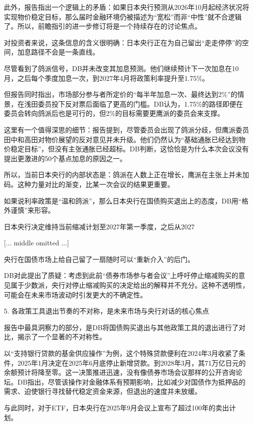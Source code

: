 \documentclass[11pt]{ctexart}
\begin{document}
此外，报告指出一个逻辑上的矛盾：如果日本央行预测从2026年10月起经济状况将实现物价稳定目标，那么届时金融环境仍被描述为“宽松”而非“中性”就不合逻辑了。所以，前瞻指引的进一步修订将是一个持续存在的讨论焦点。

对投资者来说，这条信息的含义很明确：日本央行正在为自己留出“走走停停”的空间，加息路径不会是一条直线。

尽管看到了鸽派信号，DB并未改变其加息预测。他们继续预计下一次加息在10月，之后每个季度加息一次，到2027年4月将政策利率提升至1.75\%。

但报告同时指出，市场部分参与者所定价的“每半年加息一次、最终达到2\%”的情景，在浅田委员投下反对票后面临了更高的门槛。DB认为，1.75\%的路径即便在委员会转向鸽派后也是可行的，但2\%的目标需要更鹰派的委员会来支撑。

这里有一个值得深思的细节：报告提到，尽管委员会出现了鸽派分歧，但鹰派委员田中和高田对物价展望的反对意见并未升级。他们仍然认为“基础通胀已经达到物价稳定目标”，但没有主张通胀已经超标。DB判断，这恰恰是为什么本次会议没有提出更激进的50个基点加息的原因之一。

所以，当前日本央行的内部状态是：鸽派在人数上正在增长，鹰派在主张上并未加码。这种力量对比的渐变，比某一次会议的结果更重要。

如果说利率政策是“温和鸽派”，那么日本央行在国债购买退出上的态度，DB用“格外谨慎”来形容。

日本央行决定维持当前缩减计划至2027年第一季度，之后从2027

[... middle omitted ...]

央行在国债市场上给自己留了一扇随时可以“重新介入”的后门。

DB对此提出了质疑：考虑到此前“债券市场参与者会议”上呼吁停止缩减购买的意见属于少数派，央行对停止缩减购买的决定给出的解释并不充分。这种不透明性，可能会在未来市场波动时引发更大的不确定性。

5. 各政策工具退出节奏的不对称，是未来市场与央行对话的核心焦点

报告中最具洞察力的部分，是DB将国债购买退出与其他政策工具的退出进行了对比，揭示了一个显著的不对称性。

以“支持银行贷款的基金供应操作”为例，这个特殊贷款便利在2024年3月收紧了条件，2025年1月决定在2025年6月底停止新增贷款。到2028年3月，其71万亿日元的余额预计将降至零。这一决策推进迅速，没有像债券市场会议那样的公开咨询论坛。DB指出，尽管该操作对金融体系有预期影响，比如减少对国债作为抵押品的需求、迫使银行寻找替代稳定资金来源，但退出的速度并未放缓。

与此同时，对于ETF，日本央行在2025年9月会议上宣布了超过100年的卖出计划。
\end{document}

